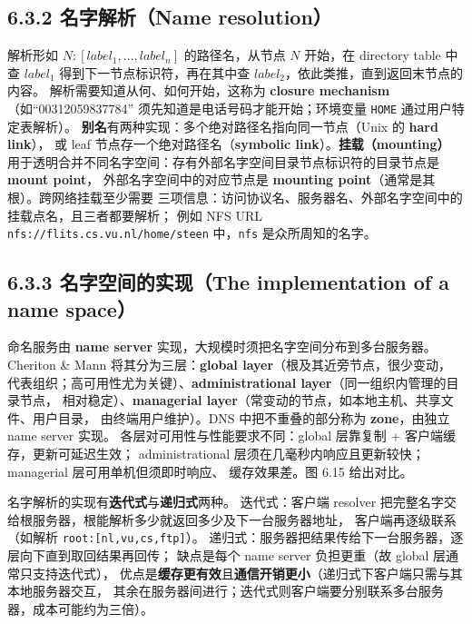 \subsection*{6.3.2 名字解析（Name resolution）}
解析形如 $N:[label_1,\dots,label_n]$ 的路径名，从节点 $N$ 开始，在 directory table 中
查 $label_1$ 得到下一节点标识符，再在其中查 $label_2$，依此类推，直到返回末节点的内容。
解析需要知道从何、如何开始，这称为 \textbf{closure mechanism}（如“00312059837784”
须先知道是电话号码才能开始；环境变量 \texttt{HOME} 通过用户特定表解析）。
\textbf{别名}有两种实现：多个绝对路径名指向同一节点（Unix 的 \textbf{hard link}），
或 leaf 节点存一个绝对路径名（\textbf{symbolic link}）。\textbf{挂载（mounting）}
用于透明合并不同名字空间：存有外部名字空间目录节点标识符的目录节点是 \textbf{mount point}，
外部名字空间中的对应节点是 \textbf{mounting point}（通常是其根）。跨网络挂载至少需要
三项信息：访问协议名、服务器名、外部名字空间中的挂载点名，且三者都要解析；
例如 NFS URL \texttt{nfs://flits.cs.vu.nl/home/steen} 中，\texttt{nfs} 是众所周知的名字。

\subsection*{6.3.3 名字空间的实现（The implementation of a name space）}
命名服务由 \textbf{name server} 实现，大规模时须把名字空间分布到多台服务器。
Cheriton \& Mann 将其分为三层：\textbf{global layer}（根及其近旁节点，很少变动，
代表组织；高可用性尤为关键）、\textbf{administrational layer}（同一组织内管理的目录节点，
相对稳定）、\textbf{managerial layer}（常变动的节点，如本地主机、共享文件、用户目录，
由终端用户维护）。DNS 中把不重叠的部分称为 \textbf{zone}，由独立 name server 实现。
各层对可用性与性能要求不同：global 层靠复制 + 客户端缓存，更新可延迟生效；
administrational 层须在几毫秒内响应且更新较快；managerial 层可用单机但须即时响应、
缓存效果差。图 6.15 给出对比。

\medskip\noindent 名字解析的实现有\textbf{迭代式}与\textbf{递归式}两种。
迭代式：客户端 resolver 把完整名字交给根服务器，根能解析多少就返回多少及下一台服务器地址，
客户端再逐级联系（如解析 \texttt{root:[nl,vu,cs,ftp]}）。
递归式：服务器把结果传给下一台服务器，逐层向下直到取回结果再回传；
缺点是每个 name server 负担更重（故 global 层通常只支持迭代式），
优点是\textbf{缓存更有效}且\textbf{通信开销更小}（递归式下客户端只需与其本地服务器交互，
其余在服务器间进行；迭代式则客户端要分别联系多台服务器，成本可能约为三倍）。

